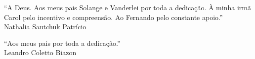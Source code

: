 
  \begin{flushright}

  \vspace*{\fill}
    
    “A Deus. Aos meus pais Solange e Vanderlei por toda a dedicação. À minha irmã Carol pelo incentivo e compreensão. Ao Fernando pelo constante apoio.” \\ Nathalia Sautchuk Patrício

  \vspace*{\fill}
    
    “Aos meus pais por toda a dedicação.” \\ Leandro Coletto Biazon

  \vspace*{\fill}

  \end{flushright}
